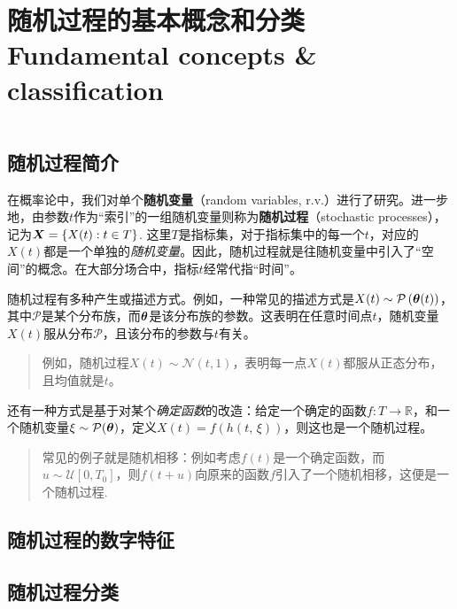 \section{随机过程的基本概念和分类 Fundamental concepts \&
classification}\label{ux968fux673aux8fc7ux7a0bux7684ux57faux672cux6982ux5ff5ux548cux5206ux7c7b-fundamental-concepts-classification}

\(\newcommand{\bs}[1]{\boldsymbol{#1}}\)

\subsection{随机过程简介}\label{ux968fux673aux8fc7ux7a0bux7b80ux4ecb}

在概率论中，我们对单个\textbf{随机变量}（random variables,
r.v.）进行了研究。进一步地，由参数\(t\)作为``索引''的一组随机变量则称为\textbf{随机过程}（stochastic
processes），记为\(\bs{X}=\{X(t):t\in T\}\).
这里\(T\)是指标集，对于指标集中的每一个\(t\)，对应的\(X(t)\)都是一个单独的\emph{随机变量}。因此，随机过程就是往随机变量中引入了``空间''的概念。在大部分场合中，指标\(t\)经常代指``时间''。

随机过程有多种产生或描述方式。例如，一种常见的描述方式是\(X(t)\sim \mathcal{P}\left(\bs{\theta}(t)\right)\)，其中\(\mathcal{P}\)是某个分布族，而\(\bs{\theta}\)是该分布族的参数。这表明在任意时间点\(t\)，随机变量\(X(t)\)服从分布\(\mathcal{P}\)，且该分布的参数与\(t\)有关。

\begin{quote}
例如，随机过程\(X(t)\sim\mathcal{N}(t,1)\)，表明每一点\(X(t)\)都服从正态分布，且均值就是\(t\)。
\end{quote}

还有一种方式是基于对某个\emph{确定函数}的改造：给定一个确定的函数\(f:T\rightarrow\mathbb{R}\)，和一个随机变量\(\xi\sim\mathcal{P}(\bs{\theta})\)，定义\(X(t)=f(h(t,\,\xi))\)，则这也是一个随机过程。

\begin{quote}
常见的例子就是随机相移：例如考虑\(f(t)\)是一个确定函数，而\(u\sim\mathcal{U}[0,T_0]\)，则\(f(t+u)\)向原来的函数\(f\)引入了一个随机相移，这便是一个随机过程.
\end{quote}

\subsection{随机过程的数字特征}\label{ux968fux673aux8fc7ux7a0bux7684ux6570ux5b57ux7279ux5f81}

\subsection{随机过程分类}\label{ux968fux673aux8fc7ux7a0bux5206ux7c7b}
